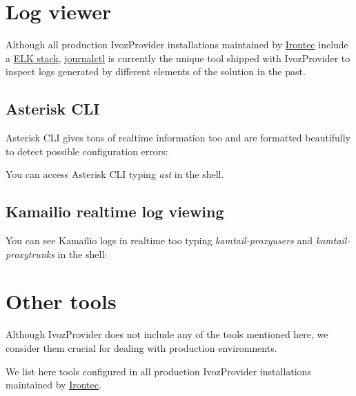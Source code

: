 \documentclass[letterpaper,10pt,english]{sphinxmanual}
\begin{document}
\section{Log viewer}
\label{security_and_maintenance/maintenance/log_viewer::doc}\label{security_and_maintenance/maintenance/log_viewer:log-viewer}
Although all production IvozProvider installations maintained by
\href{https://www.irontec.com}{Irontec} include a \href{https://www.elastic.co/elk-stack}{ELK stack}, \href{https://www.freedesktop.org/software/systemd/man/journalctl.html}{journalctl} is currently
the unique tool shipped with IvozProvider to inspect logs generated by different elements of the solution
in the past.


\subsection{Asterisk CLI}
\label{security_and_maintenance/maintenance/log_viewer:asterisk-cli}
Asterisk CLI gives tons of realtime information too and are formatted beautifully
to detect possible configuration errors:

\noindent{}

You can access Asterisk CLI typing \emph{ast} in the shell.


\subsection{Kamailio realtime log viewing}
\label{security_and_maintenance/maintenance/log_viewer:kamailio-realtime-log-viewing}
You can see Kamailio logs in realtime too typing \emph{kamtail-proxyusers} and
\emph{kamtail-proxytrunks} in the shell:

\noindent{}


\section{Other tools}
\label{security_and_maintenance/maintenance/other_tools::doc}\label{security_and_maintenance/maintenance/other_tools:other-tools}
Although IvozProvider does not include any of the tools mentioned here, we consider them crucial for dealing with
production environments.

We list here tools configured in all production IvozProvider installations maintained by
\href{https://www.irontec.com}{Irontec}.
\end{document}
